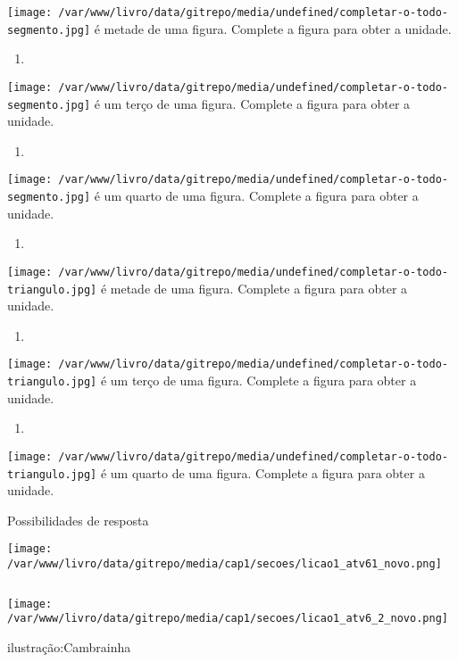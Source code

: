 \documentclass[a4paper,12pt,twoside]{book}
\begin{document}
\texttt{[image: /var/www/livro/data/gitrepo/media/undefined/completar-o-todo-segmento.jpg]} é metade de uma figura. Complete a figura para obter a unidade.
\begin{enumerate} [\quad a)] %
  \item     
\end{enumerate} %
\texttt{[image: /var/www/livro/data/gitrepo/media/undefined/completar-o-todo-segmento.jpg]} é um terço de uma figura. Complete a figura para obter a unidade.
\begin{enumerate} [\quad a)] %
  \item     
\end{enumerate} %
\texttt{[image: /var/www/livro/data/gitrepo/media/undefined/completar-o-todo-segmento.jpg]} é um quarto de uma figura. Complete a figura para obter a unidade.
\begin{enumerate} [\quad a)] %
  \item     
\end{enumerate} %
\texttt{[image: /var/www/livro/data/gitrepo/media/undefined/completar-o-todo-triangulo.jpg]} é metade de uma figura. Complete a figura para obter a unidade.
\begin{enumerate} [\quad a)] %
  \item     
\end{enumerate} %
\texttt{[image: /var/www/livro/data/gitrepo/media/undefined/completar-o-todo-triangulo.jpg]} é um terço de uma figura. Complete a figura para obter a unidade.
\begin{enumerate} [\quad a)] %
  \item     
\end{enumerate} %
\texttt{[image: /var/www/livro/data/gitrepo/media/undefined/completar-o-todo-triangulo.jpg]} é um quarto de uma figura. Complete a figura para obter a unidade.


\begin{resposta*}[breakable]{}{}  
  Possibilidades de resposta  
  
    \texttt{[image: /var/www/livro/data/gitrepo/media/cap1/secoes/licao1\_atv61\_novo.png]}  
  
  $\ $     
  
    \texttt{[image: /var/www/livro/data/gitrepo/media/cap1/secoes/licao1\_atv6\_2\_novo.png]}  
  
  ilustração:Cambrainha  
\end{resposta*}
\end{document}
